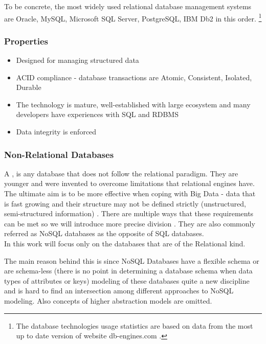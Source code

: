 To be concrete, the most widely used relational database management systems are Oracle, MySQL, Microsoft SQL Server, PostgreSQL, IBM Db2 in this order. \footnote{The database technologies usage statistics are based on data from the most up to date version of website db-engines.com \cite{DatabaseEnginesStatistics19}.}

\subsubsection{Properties}
\cite{RelationalVsNonRelationalDatabases1} \cite{RelationalVsNonRelationalDatabases2}

\begin{itemize}
	\item Designed for managing structured data
	\item ACID compliance - database transactions are Atomic, Consistent, Isolated, Durable
	\item The technology is mature, well-established with large ecosystem and many developers have experiences with SQL and RDBMS
	\item Data integrity is enforced
\end{itemize}

\subsubsection{Non-Relational Databases}
A , is any database that does not follow the relational paradigm. They are younger and were invented to overcome limitations that relational engines have. 
The ultimate aim is to be more effective when coping with Big Data - data that is fast growing and their structure may not be defined strictly (unstructured, semi-structured information) \cite{NonRelationalDBs}.
There are multiple ways that these requirements can be met so we will introduce more precise division \cite{DatabaseTypes}.
They are also commonly referred as NoSQL databases as the opposite of SQL databases. \\ 

In this work will focus only on the databases that are of the Relational kind. 

The main reason behind this is since NoSQL Databases have a flexible schema or are schema-less (there is no point in determining a database schema when data types of attributes or keys) modeling of these databases quite a new discipline and is hard to find an intersection among different approaches to NoSQL modeling.
Also concepts of higher abstraction models are omitted. \cite{NoSQLDatabaseModeling}

